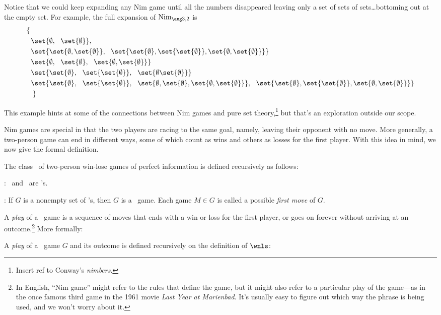 \begin{definition}
Notice that we could keep expanding any Nim game until all the numbers
disappeared leaving only a set of sets of sets\dots bottoming out at
the empty set.  For example, the full expansion of $\nimg{3,2}$ is
\begin{align*}
\left\{ \right. & \\
& \set{\emptyset,\ \ \set{\emptyset}},\\
& \set{\set{\emptyset, \set{\emptyset}},\ \ \set{\set{\emptyset}, \set{\set{\emptyset}}, \set{\emptyset, \set{\emptyset}}}}\\
& \set{\emptyset,\ \ \set{\emptyset},\ \ \set{\emptyset, \set{\emptyset}}}\\
& \set{\set{\emptyset},\ \ \set{\set{\emptyset}},\ \ \set{\emptyset \set{\emptyset}}}\\
& \set{\set{\emptyset},\ \ \set{\set{\emptyset}},\ \ \set{\emptyset, \set{\emptyset}, \set{\emptyset, \set{\emptyset}}},\ \ \set{\set{\emptyset}, \set{\set{\emptyset}}, \set{\emptyset, \set{\emptyset}}}}\\
& \left. \right\}
\end{align*}

This example hints at some of the connections between Nim games and
pure set theory,\footnote{Insert ref to Conway's \emph{nimbers}.}
but that's an exploration outside our scope.

Nim games are special in that the two players are racing to the same
goal, namely, leaving their opponent with no move.  More generally, a
two-person game can end in different ways, some of which count as wins
and others as losses for the first player.  With this idea in mind, we
now give the formal definition.

\begin{definition}
The class \wnls\ of two-person win-lose games of perfect information
is defined recursively as follows:

: \winend\ and \loseend\ are \wnls's.

: If $G$ is a nonempty set of \wnls's,
then $G$ is a \wnls\ game.  Each game $M \in G$ is called a possible
\emph{first move} of $G$.
\end{definition}

A \emph{play} of a \wnls\ game is a sequence of moves that ends with a
win or loss for the first player, or goes on forever without arriving
at an outcome.\footnote{In English, ``Nim game'' might refer to the
  rules that define the game, but it might also refer to a particular
  play of the game---as in the once famous third game in the 1961
  movie \emph{Last Year at Marienbad}.  It's usually easy to figure
  out which way the phrase is being used, and we won't worry about
  it.}
More formally:
\begin{definition*}%
A \emph{play} of a \wnls\ game $G$ and its outcome is defined
recursively on the definition of $\wnls$:


\end{definition*}
\end{definition}

